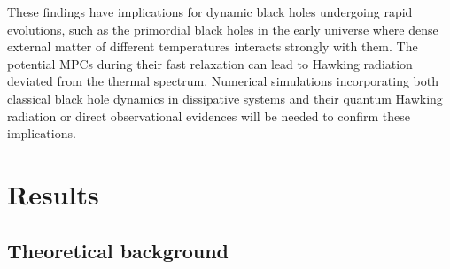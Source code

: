 \documentclass[prl,superscriptaddress,notitlepage,showpacs,twocolumn]{revtex4-2}
\begin{document}
These findings have implications for dynamic black holes undergoing rapid evolutions, such as the primordial black holes in the early universe where dense external matter of different temperatures interacts strongly with them. The potential MPCs during their fast relaxation can lead to Hawking radiation deviated from the thermal spectrum. Numerical simulations incorporating both classical black hole dynamics in dissipative systems and their quantum
Hawking radiation or direct observational evidences will be needed to confirm these implications. %

\section{Results}
\subsection{Theoretical background}
\end{document}
